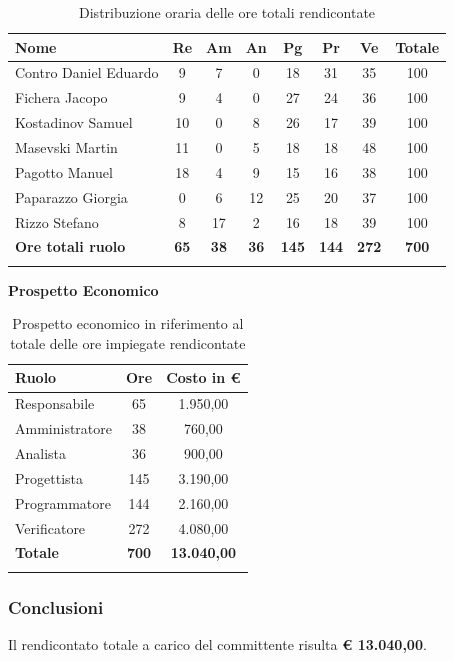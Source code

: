 \documentclass[../piano_di_progetto.tex]{subfiles}
\begin{document}
\begin{center}
	\begin{longtable}{|l|c|c|c|c|c|c|c|}
		\hline
		\rowcolor{lightgray}
		\textbf{Nome} & \textbf{Re} & \textbf{Am} & \textbf{An} & \textbf{Pg}  & \textbf{Pr}   & \textbf{Ve} & \textbf{Totale} \\

		\hline
			Contro Daniel Eduardo & 9 & 7 & 0 & 18 & 31 & 35 & 100 \\
			Fichera Jacopo & 9 & 4 & 0 & 27 & 24 & 36 & 100 \\
			Kostadinov Samuel & 10 & 0 & 8 & 26 & 17 & 39 & 100 \\		
			Masevski Martin & 11 & 0 & 5 & 18 & 18 & 48 & 100 \\
			Pagotto Manuel & 18 & 4 & 9 & 15 & 16 & 38 & 100 \\			
			Paparazzo Giorgia & 0 & 6 & 12 & 25 & 20 & 37 & 100 \\
			Rizzo Stefano & 8 & 17 & 2 & 16 & 18 & 39 & 100 \\
			\hline
			\textbf{Ore totali ruolo} & \textbf{65} & \textbf{38} & \textbf{36} & \textbf{145} & \textbf{144} & \textbf{272} & \textbf{700} \\
		\hline	
		\rowcolor{white}
		\caption{Distribuzione oraria delle ore totali rendicontate}
	\end{longtable}
\end{center}


\vspace{3cm}

\textbf{Prospetto Economico}

\begin{center}
	\begin{longtable}{|l|c|c|}
		\hline
		\rowcolor{lightgray}
		\textbf{Ruolo} & \textbf{Ore} & \textbf{Costo in €}\\
		\hline
		
		Responsabile & 65 & 1.950,00 \\
		Amministratore & 38 & 760,00 \\
		Analista & 36 & 900,00 \\
		Progettista & 145 & 3.190,00 \\
		Programmatore & 144 & 2.160,00 \\
		Verificatore & 272 & 4.080,00 \\
		\hline
		\textbf{Totale} & \textbf{700} & \textbf{13.040,00}\\
		\hline
		\rowcolor{white}
		\caption{Prospetto economico in riferimento al totale delle ore impiegate rendicontate}
	\end{longtable}
\end{center}

\subsubsection{Conclusioni}
\label{ssub:prev_conc}
Il rendicontato totale a carico del committente risulta \textbf{€ 13.040,00}.
\end{document}
